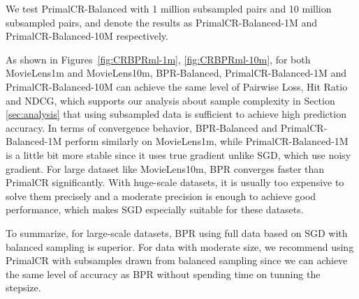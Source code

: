 \documentclass[conference]{IEEEtran}
\numberwithin{equation}{section}
\newtheorem{sampling strategy}{Sampling Strategy}
\begin{document}


We test \textsf{PrimalCR-Balanced} with 1 million subsampled pairs and 10 million subsampled pairs, and denote the results as \textsf{PrimalCR-Balanced-1M} and \textsf{PrimalCR-Balanced-10M} respectively.

As shown in Figures~\ref{fig:CRBPRml-1m}, \ref{fig:CRBPRml-10m}, for both MovieLens1m and MovieLens10m, \textsf{BPR-Balanced}, \textsf{PrimalCR-Balanced-1M} and \textsf{PrimalCR-Balanced-10M} can achieve the same level of Pairwise Loss, Hit Ratio and NDCG, which supports our {analysis about sample complexity} in Section \ref{sec:analysis} that using subsampled data is sufficient to achieve high prediction accuracy. In terms of convergence behavior, \textsf{BPR-Balanced} and \textsf{PrimalCR-Balanced-1M} perform similarly  on MovieLens1m, while \textsf{PrimalCR-Balanced-1M} is a little bit more stable since it uses true gradient unlike   SGD, which use noisy gradient. For large dataset like MovieLens10m, \textsf{BPR} converges faster than \textsf{PrimalCR} significantly. With huge-scale datasets, it is usually too expensive to solve them precisely and a moderate precision is enough to achieve good performance, which makes SGD especially suitable for these datasets.

To summarize, for large-scale datasets, \textsf{BPR} using full data based on SGD with balanced sampling is superior. For data with moderate size, we recommend using \textsf{PrimalCR} with subsamples drawn from balanced sampling { since we can achieve the same level of accuracy as BPR without spending time on tunning the stepsize}.
\end{document}
